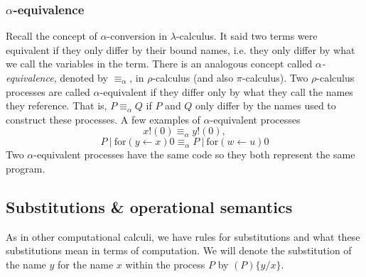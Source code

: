 \documentclass[12pt]{article}
\numberwithin{equation}{section}
\begin{document}
\subsubsection{$\alpha$-equivalence}
Recall the concept of $\alpha$-conversion in $\lambda$-calculus. It said two terms were equivalent if they only differ by their bound names, i.e. they only differ by what we call the variables in the term. There is an analogous concept called \emph{$\alpha$-equivalence}, denoted by $\equiv_{\alpha}$, in $\rho$-calculus (and also $\pi$-calculus). Two $\rho$-calculus processes are called $\alpha$-equivalent if they differ only by what they call the names they reference. That is, $P \equiv_{\alpha} Q$ if $P$ and $Q$ only differ by the names used to construct these processes. A few examples of $\alpha$-equivalent processes
\[ x!(0) \equiv_{\alpha} y!(0), \]
\[ P \ | \ \text{for}(y \leftarrow x)0 \equiv_{\alpha} P \ | \ \text{for}(w \leftarrow u)0 \] 
Two $\alpha$-equivalent processes have the same code so they both represent the same program.

\subsection{Substitutions \& operational semantics}
As in other computational calculi, we have rules for substitutions and what these substitutions mean in terms of computation. We will denote the substitution of the name $y$ for the name $x$ within the process $P$ by $(P)\{ y / x \}$.
\end{document}
